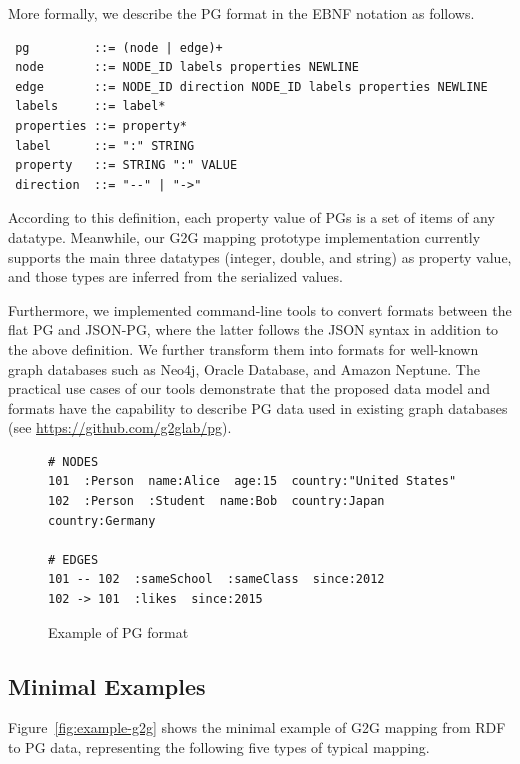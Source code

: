 \documentclass[runningheads]{llncs}
\begin{document}
More formally, we describe the PG format in the EBNF notation as follows.

\begin{defi}
\leavevmode
\begin{verbatim}
 pg         ::= (node | edge)+
 node       ::= NODE_ID labels properties NEWLINE
 edge       ::= NODE_ID direction NODE_ID labels properties NEWLINE
 labels     ::= label*
 properties ::= property*
 label      ::= ":" STRING
 property   ::= STRING ":" VALUE
 direction  ::= "--" | "->"
\end{verbatim}
\end{defi}

According to this definition, each property value of PGs is a set of items of any datatype. Meanwhile, our G2G mapping prototype implementation currently supports the main three datatypes (integer, double, and string) as property value, and those types are inferred from the serialized values.

Furthermore, we implemented command-line tools to convert formats between the flat PG and JSON-PG, where the latter follows the JSON syntax in addition to the above definition. We further transform them into formats for well-known graph databases such as Neo4j, Oracle Database, and Amazon Neptune. The practical use cases of our tools demonstrate that the proposed data model and formats have the capability to describe PG data used in existing graph databases (see \url{https://github.com/g2glab/pg}).

\begin{figure}[!t]
\begin{scriptsize}
\begin{verbatim}
# NODES
101  :Person  name:Alice  age:15  country:"United States"
102  :Person  :Student  name:Bob  country:Japan  country:Germany

# EDGES
101 -- 102  :sameSchool  :sameClass  since:2012
102 -> 101  :likes  since:2015
\end{verbatim}
\end{scriptsize}
\caption{Example of PG format}
\label{fig:example-pg}
\end{figure}


\subsection{Minimal Examples}
\label{subsec:minimal-examples}
Figure~\ref{fig:example-g2g} shows the minimal example of G2G mapping from RDF to PG data, representing the following five types of typical mapping.
\end{document}
